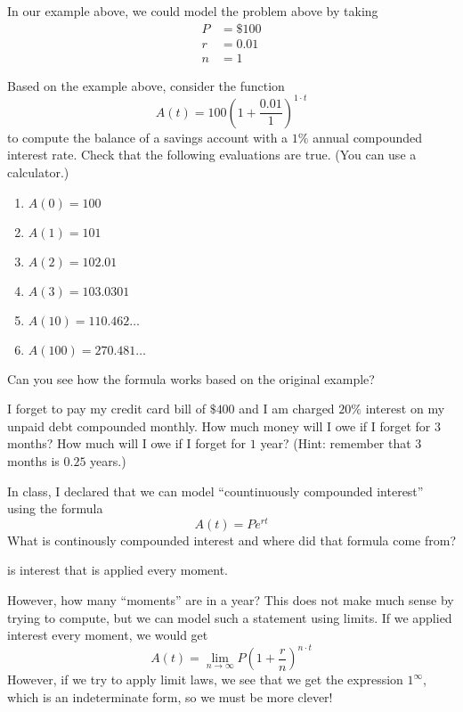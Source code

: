 \documentclass[12pt]{article}
\theoremstyle{mainstyle} %
\begin{document}
In our example above, we could model the problem above by taking
\begin{align*}
  P & = \$100 \\
  r & = 0.01 \\
  n & = 1
\end{align*}
\begin{ex}
  Based on the example above, consider the function \[
    A(t) = 100 \left( 1 + \frac{0.01}{1} \right)^{1 \cdot t}
  \]
  to compute the balance of a savings account with a \(1\%\) annual
  compounded interest rate. Check that the following evaluations are
  true. (You can use a calculator.)
  \begin{enumerate}
  \item \(A(0) = 100\)
  \item \(A(1) = 101\)
  \item \(A(2) = 102.01\)
  \item \(A(3) = 103.0301\)
  \item \(A(10) = 110.462\ldots\)
  \item \(A(100) = 270.481\ldots\)
  \end{enumerate}
  Can you see how the formula works based on the original example?
\end{ex}
\begin{ex}
  I forget to pay my credit card bill of \(\$400\) and I am charged
  \(20\%\) interest on my unpaid debt compounded monthly. How much
  money will I owe if I forget for \(3\) months? How much will I owe
  if I forget for \(1\) year? (Hint: remember that \(3\) months is
  \(0.25\) years.)
\end{ex}
In class, I declared that we can model ``countinuously compounded
interest'' using the formula \[
  A(t) = P e^{rt}
\]
What is continously compounded interest and where did that formula
come from?
\begin{defn}
   is interest that is applied
  every moment. 
\end{defn}
However, how many ``moments'' are in a year? This does not make much
sense by trying to compute, but we can model such a statement using
limits. If we applied interest every moment, we would get \[
  A(t) = \lim_{n \to \infty} P \left( 1 + \frac{r}{n} \right)^{n \cdot t}
\]
However, if we try to apply limit laws, we see that we get the
expression \(1^\infty\), which is an indeterminate form, so we must be
more clever!
\end{document}
